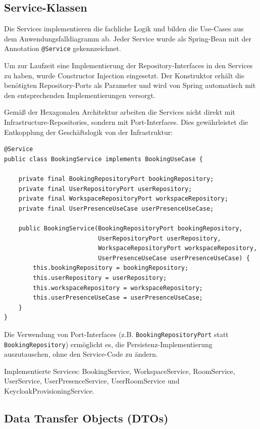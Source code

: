 \documentclass[11pt,a4paper]{report}
\begin{document}
\subsection{Service-Klassen}

Die Services implementieren die fachliche Logik und bilden die Use-Cases aus dem Anwendungsfalldiagramm ab. Jeder Service wurde als Spring-Bean mit der Annotation \texttt{@Service} gekennzeichnet.

Um zur Laufzeit eine Implementierung der Repository-Interfaces in den Services zu haben, wurde Constructor Injection eingesetzt. Der Konstruktor erhält die benötigten Repository-Ports als Parameter und wird von Spring automatisch mit den entsprechenden Implementierungen versorgt.

Gemäß der Hexagonalen Architektur arbeiten die Services nicht direkt mit Infrastructure-Repositories, sondern mit Port-Interfaces. Dies gewährleistet die Entkopplung der Geschäftslogik von der Infrastruktur:

\begin{verbatim}
@Service
public class BookingService implements BookingUseCase {

    private final BookingRepositoryPort bookingRepository;
    private final UserRepositoryPort userRepository;
    private final WorkspaceRepositoryPort workspaceRepository;
    private final UserPresenceUseCase userPresenceUseCase;

    public BookingService(BookingRepositoryPort bookingRepository,
                          UserRepositoryPort userRepository,
                          WorkspaceRepositoryPort workspaceRepository,
                          UserPresenceUseCase userPresenceUseCase) {
        this.bookingRepository = bookingRepository;
        this.userRepository = userRepository;
        this.workspaceRepository = workspaceRepository;
        this.userPresenceUseCase = userPresenceUseCase;
    }
}
\end{verbatim}

Die Verwendung von Port-Interfaces (z.B. \texttt{BookingRepositoryPort} statt \texttt{BookingRepository}) ermöglicht es, die Persistenz-Implementierung auszutauschen, ohne den Service-Code zu ändern.

Implementierte Services: BookingService, WorkspaceService, RoomService, UserService, UserPresenceService, UserRoomService und KeycloakProvisioningService.

\subsection{Data Transfer Objects (DTOs)}
\end{document}
